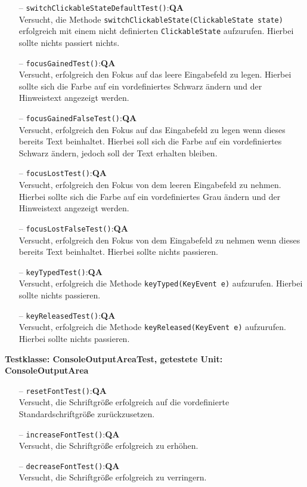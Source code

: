 \documentclass[parskip=full,11pt,twoside]{scrartcl}
\def\qa{\hfill\textbf{QA}}
\begin{document}
\begin{itemize}
	\item[--] \texttt{switchClickableStateDefaultTest()}:\qa\\
	Versucht, die Methode \texttt{switchClickableState(ClickableState state)} erfolgreich mit einem nicht definierten \texttt{ClickableState} aufzurufen. Hierbei sollte nichts passiert nichts.
	\item[--] \texttt{focusGainedTest()}:\qa\\
	Versucht, erfolgreich den Fokus auf das leere Eingabefeld zu legen. Hierbei sollte sich die Farbe auf ein vordefiniertes Schwarz ändern und der Hinweistext angezeigt werden.
	\item[--] \texttt{focusGainedFalseTest()}:\qa\\
	Versucht, erfolgreich den Fokus auf das Eingabefeld zu legen wenn dieses bereits Text beinhaltet. Hierbei soll sich die Farbe auf ein vordefiniertes Schwarz ändern, jedoch soll der Text erhalten bleiben.
	\item[--] \texttt{focusLostTest()}:\qa\\
	Versucht, erfolgreich den Fokus von dem leeren Eingabefeld zu nehmen. Hierbei sollte sich die Farbe auf ein vordefiniertes Grau ändern und der Hinweistext angezeigt werden.
	\item[--] \texttt{focusLostFalseTest()}:\qa\\
	Versucht, erfolgreich den Fokus von dem Eingabefeld zu nehmen wenn dieses bereits Text beinhaltet. Hierbei sollte nichts passieren.
	\item[--] \texttt{keyTypedTest()}:\qa\\
	Versucht, erfolgreich die Methode \texttt{keyTyped(KeyEvent e)} aufzurufen. Hierbei sollte nichts passieren.
	\item[--] \texttt{keyReleasedTest()}:\qa\\
	Versucht, erfolgreich die Methode \texttt{keyReleased(KeyEvent e)} aufzurufen. Hierbei sollte nichts passieren.
\end{itemize}

\textbf{Testklasse: ConsoleOutputAreaTest, getestete Unit: ConsoleOutputArea}
\begin{itemize}
	\item[--] \texttt{resetFontTest()}:\qa\\
	Versucht, die Schriftgröße erfolgreich auf die vordefinierte Standardschriftgröße zurückzusetzen.
	\item[--] \texttt{increaseFontTest()}:\qa\\
	Versucht, die Schriftgröße erfolgreich zu erhöhen.
	\item[--] \texttt{decreaseFontTest()}:\qa\\
	Versucht, die Schriftgröße erfolgreich zu verringern.
\end{itemize}
\end{document}
